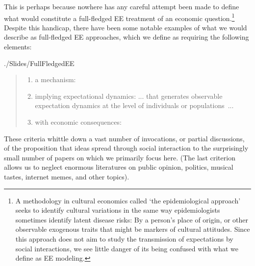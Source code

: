 This is perhaps because nowhere has any careful attempt been made to define what would constitute a full-fledged EE treatment of an economic question.\footnote{A methodology in cultural economics called `the epidemiological approach' seeks to identify cultural variations in the same way epidemiologists sometimes identify latent disease risks: By a person's place of origin, or other observable exogenous traits that might be markers of cultural attitudes.  Since this approach does not aim to study the transmission of expectations by social interactions, we see little danger of its being confused with what we define as EE modeling.}  Despite this handicap, there have been some notable examples of what we would describe as full-fledged EE approaches, which we define as requiring the following elements:%
\begin{verbatimwrite}{./Slides/FullFledgedEE}
  \begin{quote}\normalfont
    \begin{enumerate}
    \item a mechanism: 
    \item implying expectational dynamics: 
      {... that generates observable expectation dynamics at the level of individuals or populations~...}
    \item with economic consequences: 
    \end{enumerate}
  \end{quote}
\end{verbatimwrite}

These criteria whittle down a vast number of invocations, or partial discussions, of the proposition that ideas spread through social interaction to the surprisingly small number of papers on which we primarily focus here.  (The last criterion allows us to neglect enormous literatures on public opinion, politics, musical tastes, internet memes, and other topics).

